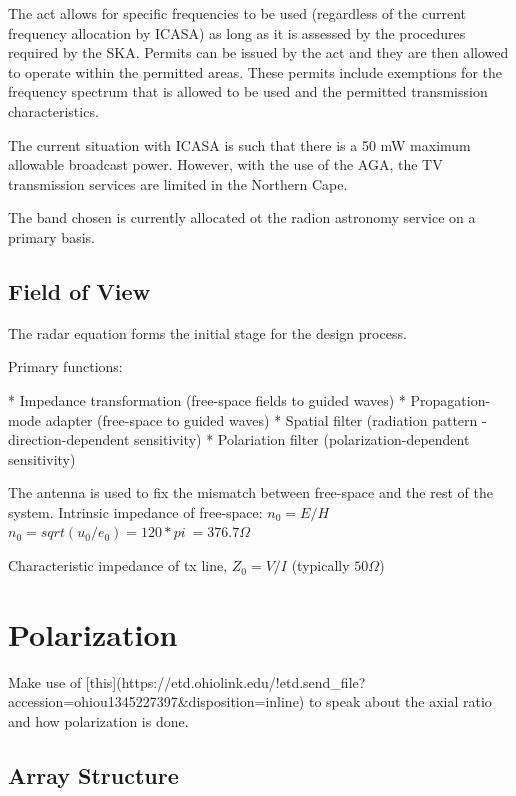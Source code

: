 \documentclass[11pt]{witseiepaper}
\begin{document}
The act allows for specific frequencies to be used (regardless of the current frequency allocation by ICASA) as long as it is assessed by the procedures required by the SKA. Permits can be issued by the act and they are then allowed to operate within the permitted areas. These permits include exemptions for the frequency spectrum that is allowed to be used and the permitted transmission characteristics.

The current situation with ICASA is such that there is a 50 mW maximum allowable broadcast power. However, with the use of the AGA, the TV transmission services are limited in the Northern Cape.

The band chosen is currently allocated ot the radion astronomy service on a primary basis.




\subsection{Field of View} \label{sec:FieldOfView}



The radar equation forms the initial stage for the design process.

Primary functions:

    * Impedance transformation (free-space fields to guided waves)
    * Propagation-mode adapter (free-space to guided waves)
    * Spatial filter (radiation pattern - direction-dependent sensitivity)
    * Polariation filter (polarization-dependent sensitivity)

The antenna is used to fix the mismatch between free-space and the rest of the system.
Intrinsic impedance of free-space: $n_0 = E/H$
$n_0 = sqrt(u_0 / e_0) = 120 * pi ~= 376.7 \Omega$

Characteristic impedance of tx line, $Z_0 = V/I$ (typically $50 \Omega$)

\section{Polarization}

Make use of [this](https://etd.ohiolink.edu/!etd.send\_file?accession=ohiou1345227397\&disposition=inline) to speak about the axial ratio and how polarization is done.

\subsection{Array Structure}
\end{document}
